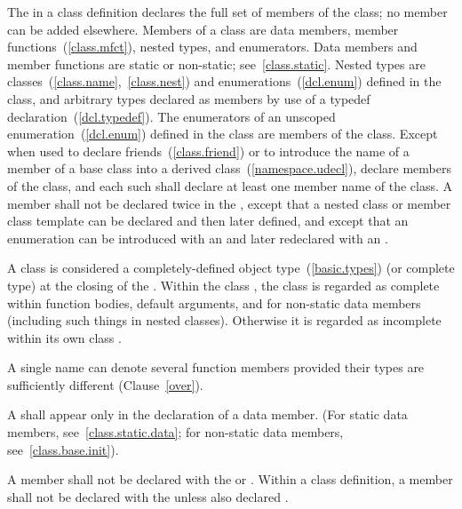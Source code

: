 \pnum
{}%
The  in a class definition declares the
full set of members of the class; no member can be added elsewhere.
Members of a class are data members, member
functions~(\ref{class.mfct}), nested types, and enumerators. Data
members and member functions are static or non-static;
see~\ref{class.static}. Nested types are
classes~(\ref{class.name},~\ref{class.nest}) and
enumerations~(\ref{dcl.enum}) defined in the class, and arbitrary types
declared as members by use of a typedef declaration~(\ref{dcl.typedef}).
The enumerators of an unscoped enumeration~(\ref{dcl.enum}) defined in the class
are members of the class. Except when used to declare
friends~(\ref{class.friend}) or to introduce the name of a member of a
base class into a derived
class~(\ref{namespace.udecl}),
 declare members of the class, and each
such  shall declare at least one member
name of the class. A member shall not be declared twice in the
, except that a nested class or member
class template can be declared and then later defined, and except that an
enumeration can be introduced with an  and later
redeclared with an .

\pnum
{}%
A class is considered a completely-defined object
type~(\ref{basic.types}) (or complete type) at the closing \tcode{\}} of
the .
Within the class
, the class is regarded as complete
within function bodies, default arguments, and
 for non-static data members
(including such things in nested classes).
Otherwise it is regarded as incomplete within its own class
.

\pnum
\enternote
A single name can denote several function members provided their types
are sufficiently different (Clause~\ref{over}).
\exitnote

\pnum
A  shall appear only in the
declaration of a data member. (For static data members,
see~\ref{class.static.data}; for non-static data members,
see~\ref{class.base.init}).

\pnum
A member shall not be declared with the 
or 
. Within a class definition, a member shall not be declared with the   unless also declared .

